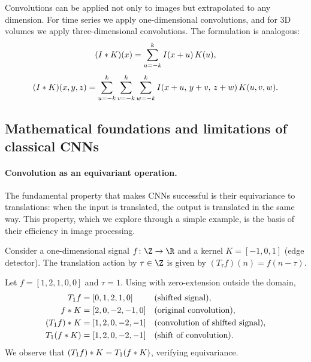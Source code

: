 Convolutions can be applied not only to images but extrapolated to any
dimension. For time series we apply one-dimensional convolutions, and for 3D
volumes we apply three-dimensional convolutions. The formulation is analogous:
\begin{equation}
  (I * K)(x) = \sum_{u=-k}^{k} I(x+u)\, K(u),
  \label{eq:grids:convolution1d}
\end{equation}
\begin{equation}
  (I * K)(x,y,z) = \sum_{u=-k}^{k}\sum_{v=-k}^{k}\sum_{w=-k}^{k}
    I(x+u,\, y+v,\, z+w)\, K(u,v,w).
  \label{eq:grids:convolution3d}
\end{equation}

\subsection{Mathematical foundations and limitations of classical CNNs}
\label{sec:grids:foundations-limits}

\paragraph{Convolution as an equivariant operation.}
The fundamental property that makes CNNs successful is their equivariance to
translations: when the input is translated, the output is translated in the same
way. This property, which we explore through a simple example, is the basis of
their efficiency in image processing.

\begin{example}
\label{ex:grids:equiv-1d}
Consider a one-dimensional signal $f \colon \Z \to \R$ and a kernel
$K = [-1, 0, 1]$ (edge detector). The translation action by $\tau \in \Z$ is
given by $(T_\tau f)(n) = f(n - \tau)$.

Let $f = [1, 2, 1, 0, 0]$ and $\tau = 1$. Using
 with zero-extension outside the domain,
\begin{align}
T_1 f &= [0, 1, 2, 1, 0] && \text{(shifted signal)}, \\
f * K &= [2, 0, -2, -1, 0] && \text{(original convolution)}, \\
(T_1 f) * K &= [1, 2, 0, -2, -1] && \text{(convolution of shifted signal)}, \\
T_1(f * K) &= [1, 2, 0, -2, -1] && \text{(shift of convolution)}.
\end{align}
We observe that $(T_1 f) * K = T_1(f * K)$, verifying equivariance.
\end{example}

